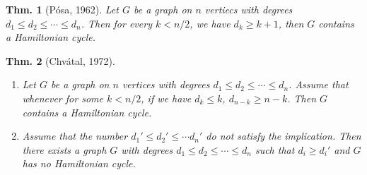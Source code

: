 \documentclass[12pt, a4paper]{book}
\newtheorem{theorem}{Thm.}[section]
\theoremstyle{nonumberplain}
\begin{document}
\begin{theorem}[P\'osa, 1962]
    Let $G$ be a graph on $n$ vertiecs with degrees $d_1\leq d_2\leq\cdots\leq d_n$.
    Then for every $k<n/2$, we have $d_k\geq k+1$, then $G$ contains a Hamiltonian cycle.
\end{theorem}
\begin{theorem}[Chv\'atal, 1972]
    \hfill
    \begin{enumerate}[nolistsep, label=(\roman*)]
        \item Let $G$ be a graph on $n$ vertices with degrees $d_1\leq d_2\leq\cdots\leq d_n$.
            Assume that whenever for some $k<n/2$, if we have $d_k\leq k$, $d_{n-k}\geq n-k$.
            Then $G$ contains a Hamiltonian cycle.
        \item Assume that the number $d_1'\leq d_2'\leq\cdots d_n'$ do not satisfy the implication.
            Then there exists a graph $G$ with degrees $d_1\leq d_2\leq\cdots\leq d_n$ such that $d_i\geq d_i'$ and $G$ has no Hamiltonian cycle.
    \end{enumerate}
\end{theorem}
\end{document}
